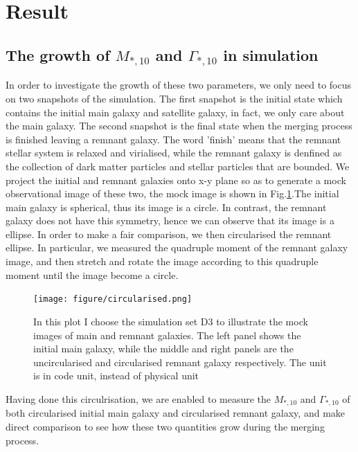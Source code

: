 \documentclass[fleqn,usenatbib]{mnras}
\begin{document}
\section{Result}
\subsection{The growth of $M_{*,10}$ and $\Gamma_{*,10}$ in simulation}
In order to investigate the growth of these two parameters, we only need to focus on two snapshots of the simulation. The first snapshot is the initial state which contains the initial main galaxy and satellite galaxy, in fact, we only care about the main galaxy. The second snapshot is the final state when the merging process is finished leaving a remnant galaxy. The word 'finish' means that the remnant stellar system is relaxed and virialised, while the remnant galaxy is denfined as the collection of dark matter particles and stellar particles that are bounded. We project the initial and remnant galaxies onto x-y plane so as to generate a mock observational image of these two, the mock image is shown in Fig.\ref{fig:mock_image}.The initial main galaxy is spherical, thus its image is a circle. In contrast, the remnant galaxy does not have this symmetry, hence we can observe that its image is a ellipse. In order to make a fair comparison, we then circularised the remnant ellipse. In particular, we measured the quadruple moment of the remnant galaxy image, and then stretch and rotate the image according to this quadruple moment until the image become a circle.
\begin{figure}
    \centering
    \texttt{[image: figure/circularised.png]}
    \caption{\label{fig:mock_image}In this plot I choose the simulation set D3 to illustrate the mock images of main and remnant galaxies. The left panel shows the  initial main galaxy, while the middle and right panels are  the uncircularised and circularised remnant galaxy respectively. The unit is in code unit, instead of physical unit}
\end{figure}
Having done this circulrisation, we are enabled to measure the $M_{*,10}$ and $\Gamma_{*,10}$ of both circularised initial main galaxy and circularised remnant galaxy, and make direct comparison to see how these two quantities grow during the merging process.
\end{document}
